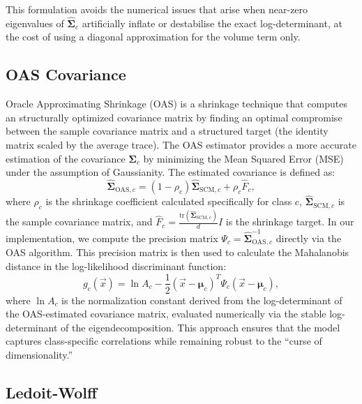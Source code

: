 This formulation avoids the numerical issues that arise when near-zero eigenvalues of $\hat{\boldsymbol{\Sigma}}_c$ artificially inflate or destabilise the exact log-determinant, at the cost of using a diagonal approximation for the volume term only.

\subsection{OAS Covariance}
\label{sec:method:oas}

Oracle Approximating Shrinkage (OAS) is a shrinkage technique that computes an structurally optimized covariance matrix by finding an optimal compromise between the sample covariance matrix and a structured target (the identity matrix scaled by the average trace). The OAS estimator provides a more accurate estimation of the covariance $\boldsymbol{\Sigma}_c$ by minimizing the Mean Squared Error (MSE) under the assumption of Gaussianity. The estimated covariance is defined as:
\begin{equation}
	\hat{\boldsymbol{\Sigma}}_{\text{OAS}, c} = (1 - \rho_c) \hat{\boldsymbol{\Sigma}}_{\text{SCM}, c} + \rho_c \hat{F}_c,
\end{equation}
where $\rho_c$ is the shrinkage coefficient calculated specifically for class $c$, $\hat{\boldsymbol{\Sigma}}_{\text{SCM}, c}$ is the sample covariance matrix, and $\hat{F}_c = \frac{\text{tr}(\hat{\boldsymbol{\Sigma}}_{\text{SCM}, c})}{d} I$ is the shrinkage target. In our implementation, we compute the precision matrix $\Psi_c = \hat{\boldsymbol{\Sigma}}_{\text{OAS}, c}^{-1}$ directly via the OAS algorithm. This precision matrix is then used to calculate the Mahalanobis distance in the log-likelihood discriminant function:
\begin{equation}
	g_c(\vec{x}) = \ln A_c - \frac{1}{2} (\vec{x} - \boldsymbol{\mu}_c)^T \Psi_c (\vec{x} - \boldsymbol{\mu}_c),
\end{equation}
where $\ln A_c$ is the normalization constant derived from the log-determinant of the OAS-estimated covariance matrix, evaluated numerically via the stable log-determinant of the eigendecomposition. This approach ensures that the model captures class-specific correlations while remaining robust to the ``curse of dimensionality.''

\subsection{Ledoit-Wolff}
\label{sec:method:ledoitwolf}

